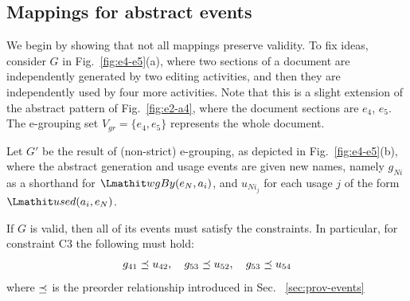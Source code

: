 %

\subsection{Mappings for abstract events }

We begin by showing that not all mappings preserve validity.
To fix ideas, consider $G$ in Fig.~\ref{fig:e4-e5}(a), where two sections of a document are independently generated by two editing activities, and then they are independently used by four more activities. Note that this is a slight extension of the abstract pattern of Fig.~\ref{fig:e2-a4}, where the document sections are $e_4$, $e_5$.
%
The e-grouping set $V_{gr} = \{ e_4, e_5\}$ represents the whole document. 

Let $G'$ be the result of (non-strict) e-grouping, as depicted in Fig.~\ref{fig:e4-e5}(b), where the abstract generation and usage events are given new names, namely $g_{Ni}$ as a shorthand for $\wgby(e_N,a_i)$, and $u_{Ni_j}$ for each usage $j$ of the form $\used(a_i, e_N)$. 
%

If $G$ is valid, then all of its events must satisfy the constraints. 
In particular, for constraint C3 the following must hold:
\begin{align}
\label{eq:c3-G}
g_{41} \preceq u_{42}, \quad g_{53} \preceq u_{52}, \quad g_{53} \preceq u_{54} 
\end{align}
where $\preceq$ is the preorder relationship introduced in Sec. ~\ref{sec:prov-events}

